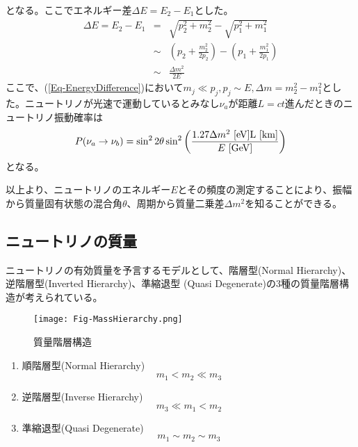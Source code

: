 \documentclass[a4paper,10pt]{jreport}
\begin{document}
となる。ここでエネルギー差$\Delta E=E_2-E_1$とした。
\begin{eqnarray} \label{Eq-EnergyDifference}
	\Delta E=E_2-E_1 &=& \sqrt{p_2^2+m_2^2}-\sqrt{p_1^2+m_1^2} \nonumber \\
	&\sim& \left( p_2+\frac{m_2^2}{2p_2} \right)-\left( p_1+\frac{m_1^2}{2p_1} \right) \nonumber \\
	&\sim& \frac{\Delta m^2}{2E}
\end{eqnarray}
ここで、(\ref{Eq-EnergyDifference})において$m_j\ll p_j,p_j\sim E,\Delta m=m_2^2-m_1^2$とした。ニュートリノが光速で運動しているとみなし$\nu_a$が距離$L=ct$進んだときのニュートリノ振動確率は
\begin{equation} \label{P_NeutrinoOscillation_c}
P(\nu_a\to\nu_b) = \sin^22\theta\sin^2\left(\frac{1.27\Delta m^2\ [\rm{eV}] L\ [\rm{km}]}{E\ [\rm{GeV}]}\right)
\end{equation}
となる。\cite{Syuron_2010}

以上より、ニュートリノのエネルギー$E$とその頻度の測定することにより、振幅から質量固有状態の混合角$\theta$、周期から質量二乗差$\Delta m^2$を知ることができる。



\subsection{ニュートリノの質量}

ニュートリノの有効質量を予言するモデルとして、階層型(Normal Hierarchy)、逆階層型(Inverted Hierarchy)、準縮退型 (Quasi Degenerate)の3種の質量階層構造が考えられている。

\begin{figure}[H]
	\center
	\texttt{[image: Fig-MassHierarchy.png]}
	\caption{質量階層構造} \label{Fig-MassHierarchy.png}
\end{figure}

\begin{enumerate}
	\item 順階層型(Normal Hierarchy) \\
	\begin{equation}
		m_1 < m_2 \ll m_3
	\end{equation}
	
	\item 逆階層型(Inverse Hierarchy) \\
	\begin{equation}
		m_3 \ll m_1 < m_2
	\end{equation}
	
	\item 準縮退型(Quasi Degenerate) \\
	\begin{equation}
		m_1 \sim m_2 \sim m_3
	\end{equation}
	
\end{enumerate}
\end{document}
